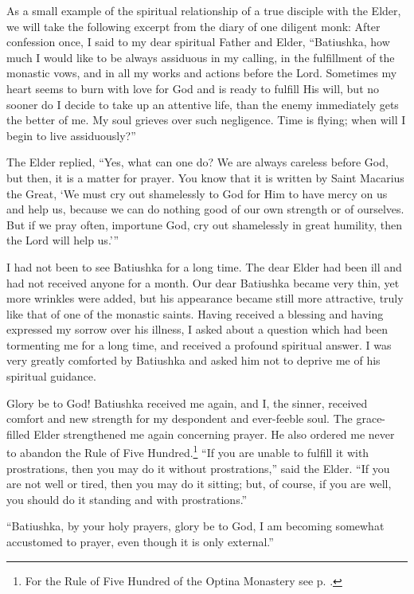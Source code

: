\begin{longquote}{As a small example of the spiritual relationship of a true disciple with the Elder, we will take the following excerpt from the diary of one diligent monk:}
After confession once, I said to my dear spiritual Father and Elder, ``Batiushka, how much I would like to be always assiduous in my calling, in the fulfillment of the monastic vows, and in all my works and actions before the Lord. Sometimes my heart seems to burn with love for God and is ready to fulfill His will, but no sooner do I decide to take up an attentive life, than the enemy immediately gets the better of me. My soul grieves over such negligence. Time is flying; when will I begin to live assiduously?''

The Elder replied, ``Yes, what can one do? We are always careless before God, but then, it is a matter for prayer. You know that it is written by Saint Macarius the Great, `We must cry out shamelessly to God for Him to have mercy on us and help us, because we can do nothing good of our own strength or of ourselves. But if we pray often, importune God, cry out shamelessly in great humility, then the Lord will help us.'''

I had not been to see Batiushka for a long time. The dear Elder had been ill and had not received anyone for a month. Our dear Batiushka became very thin, yet more wrinkles were added, but his appearance became still more attractive, truly like that of one of the monastic saints. Having received a blessing and having expressed my sorrow over his illness, I asked about a question which had been tormenting me for a long time, and received a profound spiritual answer. I was very greatly comforted by Batiushka and asked him not to deprive me of his spiritual guidance.

Glory be to God! Batiushka received me again, and I, the sinner, received comfort and new strength for my despondent and ever-feeble soul. The grace-filled Elder strengthened me again concerning prayer. He also ordered me never to abandon the Rule of Five Hundred.\footnote{For the Rule of Five Hundred of the Optina Monastery see p. \pageref{cell-rule}.} ``If you are unable to fulfill it with prostrations, then you may do it without prostrations,'' said the Elder. ``If you are not well or tired, then you may do it sitting; but, of course, if you are well, you should do it standing and with prostrations.''

``Batiushka, by your holy prayers, glory be to God, I am becoming somewhat accustomed to prayer, even though it is only external.''


\end{longquote}
